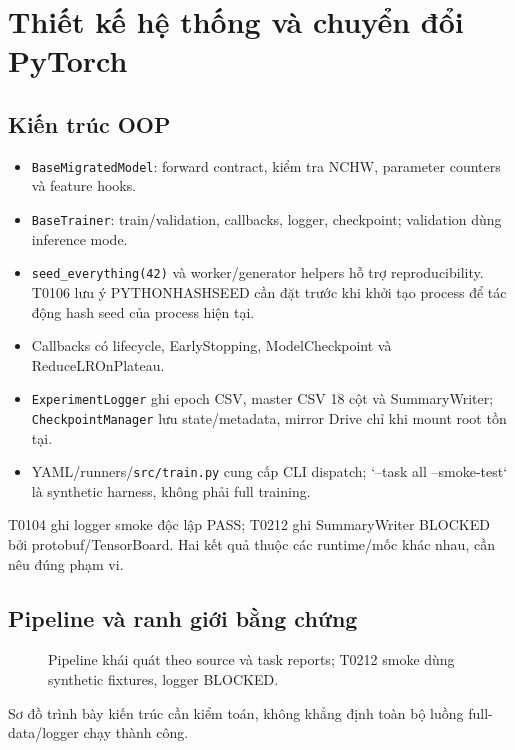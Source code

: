 \chapter{Thiết kế hệ thống và chuyển đổi PyTorch}
\section{Kiến trúc OOP}
\begin{itemize}
\item \texttt{BaseMigratedModel}: forward contract, kiểm tra NCHW, parameter counters và feature hooks.
\item \texttt{BaseTrainer}: train/validation, callbacks, logger, checkpoint; validation dùng inference mode.
\item \texttt{seed\_everything(42)} và worker/generator helpers hỗ trợ reproducibility. T0106 lưu ý PYTHONHASHSEED cần đặt trước khi khởi tạo process để tác động hash seed của process hiện tại.
\item Callbacks có lifecycle, EarlyStopping, ModelCheckpoint và ReduceLROnPlateau.
\item \texttt{ExperimentLogger} ghi epoch CSV, master CSV 18 cột và SummaryWriter; \texttt{CheckpointManager} lưu state/metadata, mirror Drive chỉ khi mount root tồn tại.
\item YAML/runners/\texttt{src/train.py} cung cấp CLI dispatch; `--task all --smoke-test` là synthetic harness, không phải full training.
\end{itemize}
T0104 ghi logger smoke độc lập PASS; T0212 ghi SummaryWriter BLOCKED bởi protobuf/TensorBoard. Hai kết quả thuộc các runtime/mốc khác nhau, cần nêu đúng phạm vi.

\section{Pipeline và ranh giới bằng chứng}
\begin{figure}[htbp]
\centering
{}
\caption{Pipeline khái quát theo source và task reports; T0212 smoke dùng synthetic fixtures, logger BLOCKED.}
\label{fig:t0402-pipeline}
\end{figure}
Sơ đồ trình bày kiến trúc cần kiểm toán, không khẳng định toàn bộ luồng full-data/logger chạy thành công.

